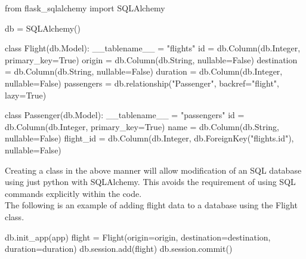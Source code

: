 \documentclass[]{book}
\newenvironment{Shaded}{\begin{snugshade}}{\end{snugshade}}
\newcommand{\StringTok}[1]{\textcolor[rgb]{0.31,0.60,0.02}{#1}}
\newcommand{\FunctionTok}[1]{\textcolor[rgb]{0.00,0.00,0.00}{#1}}
\newcommand{\VariableTok}[1]{\textcolor[rgb]{0.00,0.00,0.00}{#1}}
\newcommand{\BuiltInTok}[1]{#1}
\newcommand{\ExtensionTok}[1]{#1}
\newcommand{\NormalTok}[1]{#1}
\begin{document}
\begin{Shaded}
\begin{Highlighting}[]
\ExtensionTok{from}\NormalTok{ flask_sqlalchemy import SQLAlchemy               }
                                                      
\ExtensionTok{db}\NormalTok{ = SQLAlchemy()                                     }
                                                      
\ExtensionTok{class}\NormalTok{ Flight(db.Model)}\BuiltInTok{:}                               
    \ExtensionTok{__tablename__}\NormalTok{ = }\StringTok{"flights"}                         
    \FunctionTok{id}\NormalTok{ = db.Column(db.Integer, primary_key=True)      }
    \ExtensionTok{origin}\NormalTok{ = db.Column(db.String, nullable=False)     }
    \ExtensionTok{destination}\NormalTok{ = db.Column(db.String, nullable=False)}
    \ExtensionTok{duration}\NormalTok{ = db.Column(db.Integer, nullable=False)  }
    \ExtensionTok{passengers}\NormalTok{ = db.relationship(}\StringTok{"Passenger"}\NormalTok{, backref=}\StringTok{"flight"}\NormalTok{, lazy=True)}

\ExtensionTok{class}\NormalTok{ Passenger(db.Model)}\BuiltInTok{:}                                                        
    \ExtensionTok{__tablename__}\NormalTok{ = }\StringTok{"passengers"}                                                  
    \FunctionTok{id}\NormalTok{ = db.Column(db.Integer, primary_key=True)                                  }
    \ExtensionTok{name}\NormalTok{ = db.Column(db.String, nullable=False)                                   }
    \ExtensionTok{flight_id}\NormalTok{ = db.Column(db.Integer, db.ForeignKey(}\StringTok{"flights.id"}\NormalTok{), }\VariableTok{nullable=}\NormalTok{False)}
\end{Highlighting}
\end{Shaded}

Creating a class in the above manner will allow modification of an SQL
database using just python with SQLAlchemy. This avoids the requirement
of using SQL commands explicitly within the code.\\
The following is an example of adding flight data to a database using
the Flight class.

\begin{Shaded}
\begin{Highlighting}[]
\ExtensionTok{db.init_app}\NormalTok{(app)}
\ExtensionTok{flight}\NormalTok{ = Flight(origin=origin, destination=destination, duration=duration)}
\ExtensionTok{db.session.add}\NormalTok{(flight)                                                    }
\ExtensionTok{db.session.commit}\NormalTok{()}
\end{Highlighting}
\end{Shaded}
\end{document}
